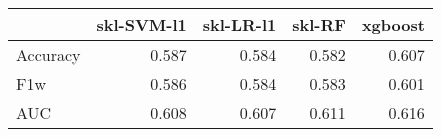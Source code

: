 \begin{tabular}{lrrrr}
\toprule
{} &  skl-SVM-l1 &  skl-LR-l1 &  skl-RF &  xgboost \\
\midrule
Accuracy &       0.587 &      0.584 &   0.582 &    0.607 \\
F1w      &       0.586 &      0.584 &   0.583 &    0.601 \\
AUC      &       0.608 &      0.607 &   0.611 &    0.616 \\
\bottomrule
\end{tabular}
